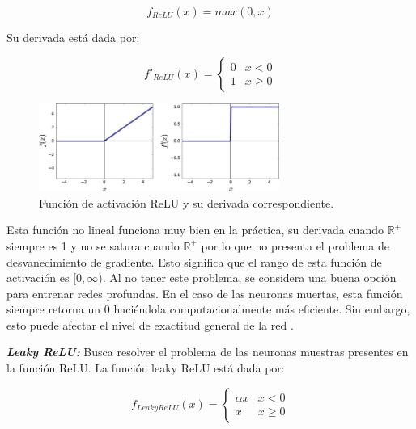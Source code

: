 \begin{equation}
    f_{ReLU}(x) = max(0,x)
\end{equation}

Su derivada está dada por:

\begin{equation}
    {f}'_{ReLU}(x) = \left\{\begin{matrix}
        0 & x < 0         \\
        1 & x \geqslant 0
    \end{matrix}\right.
\end{equation}

\begin{figure}[H]
    \begin{center}
        \includegraphics[width=0.7\textwidth]{Images/relu.png}
    \end{center}
    \caption{Función de activación ReLU y su derivada correspondiente.}
    \label{fig:relu}
\end{figure}

Esta función no lineal funciona muy bien en la práctica, su derivada cuando $ \mathbb{R}^{+}$ siempre es 1 y no se satura cuando $ \mathbb{R}^{+}$ por lo que no presenta el problema de desvanecimiento de gradiente. Esto significa que el rango de esta función de activación es $[0, \infty)$. Al no tener este problema, se considera una buena opción para entrenar redes profundas. En el caso de las neuronas muertas, esta función siempre retorna un 0 haciéndola computacionalmente más eficiente. Sin embargo, esto puede afectar el nivel de exactitud general de la red \cite{aghdam2017guide}.

\textbf{\textit{Leaky ReLU:}} Busca resolver el problema de las neuronas muestras presentes en la función ReLU. La función leaky ReLU está dada por:

\begin{equation}
    {f}_{Leaky ReLU}(x) = \left\{\begin{matrix}
        \alpha x & x < 0         \\
        x        & x \geqslant 0
    \end{matrix}\right.
\end{equation}


